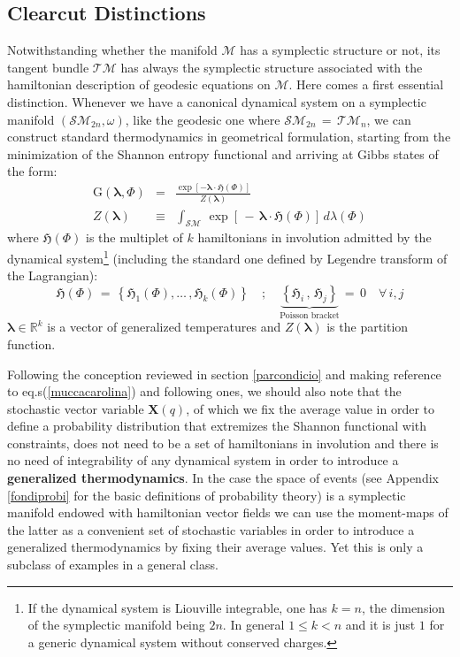\documentclass[10pt,a4paper]{article}
\begin{document}
\subsection{Clearcut Distinctions}
\label{cromatillo}
Notwithstanding whether the manifold $\mathcal{M}$ has a symplectic structure or not, its tangent bundle $\mathcal{TM}$ has always the symplectic structure associated with the hamiltonian description of geodesic equations on $\mathcal{M}$.
Here comes a first essential distinction. Whenever we have a canonical dynamical system on a symplectic manifold $\left(\mathcal{SM}_{2n},\omega\right)$, like the geodesic one where $\mathcal{SM}_{2n}\, = \, \mathcal{TM}_{n}$, we can construct standard thermodynamics in geometrical formulation, starting from the minimization of the Shannon entropy functional and arriving at Gibbs states of the form:
\begin{eqnarray}\label{predone}
  \mathrm{G}\left(\boldsymbol{\lambda},\Phi\right)&=&
  \frac{\exp\left[-\boldsymbol{\lambda}\cdot \boldsymbol{\mathfrak{H}}(\Phi)\right]}{Z(\boldsymbol{\lambda})}\nonumber\\
  Z(\boldsymbol{\lambda}) & \equiv & \int_{\mathcal{SM}}\,  \exp\left[\,-\,\boldsymbol{\lambda}\cdot \boldsymbol{\mathfrak{H}}(\Phi)\right]\,  d\lambda(\Phi)
\end{eqnarray}
where $\boldsymbol{\mathfrak{H}}(\Phi)$ is the multiplet of $k$
hamiltonians in involution admitted by the dynamical system\footnote{If the dynamical system is Liouville integrable, one has $k=n$, the dimension of the symplectic manifold  being $2n$. In general $1 \leq k<n$ and it is just $1$ for a generic dynamical system without conserved charges.}
(including the standard one defined by Legendre transform of the Lagrangian):
\begin{equation}\label{larvatarlo}
 \boldsymbol{\mathfrak{H}}(\Phi) \, = \, \left\{\mathfrak{H}_1(\Phi),\dots \, , \mathfrak{H}_k (\Phi)\right\} \quad ; \quad \underbrace{\left\{\mathfrak{H}_i \, , \, \mathfrak{H}_j\right\}}_{\text{Poisson bracket}}\, = \, 0 \quad \forall\, i,j
\end{equation}
$\boldsymbol{\lambda} \in \mathbb{R}^k$ is a vector of generalized temperatures and $Z(\boldsymbol{\lambda})$ is the partition function.
\par
Following the conception reviewed in section \ref{parcondicio} and making reference to eq.s(\ref{muccacarolina}) and following ones, we  should also note that the stochastic vector variable $\mathbf{X}(q)$, of which we fix the average value in order to define a probability distribution that extremizes the Shannon functional with constraints, does not need to be a set of hamiltonians in involution and there is no need of integrability of any dynamical system in order to introduce a \textbf{generalized thermodynamics}. In the case the space of events (see Appendix \ref{fondiprobi} for the basic definitions of probability theory) is a symplectic manifold endowed with hamiltonian vector fields we can use the moment-maps of the latter as a convenient set of stochastic variables in order to introduce a generalized thermodynamics by fixing their average values. Yet this is only a subclass of examples in a general class.
\end{document}
